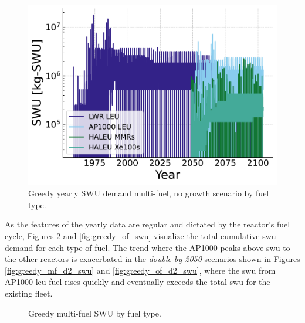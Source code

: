 \begin{figure}[H]
    \centering
    \includegraphics[scale=0.7]{images/results/swu/multi_dgng_swu_by_fuel.pdf}
    \caption{Greedy yearly SWU demand multi-fuel, no growth scenario by fuel type.}
    \label{fig:swu_yearly_greedy}
\end{figure}

As the features of the yearly data are regular and dictated by the reactor's fuel cycle, Figures \ref{fig:greedy_mf_swu} and \ref{fig:greedy_of_swu} visualize the total cumulative \gls{swu} demand for each type of fuel. The trend where the AP1000 peaks above \gls{swu} to the other reactors is exacerbated in the \textit{double by 2050} scenarios shown in Figures \ref{fig:greedy_mf_d2_swu} and \ref{fig:greedy_of_d2_swu}, where the \gls{swu} from AP1000 \gls{leu} fuel rises quickly and eventually exceeds the total \gls{swu} for the existing fleet.

\begin{figure}[H]
  \hfill
  \caption{Greedy multi-fuel SWU by fuel type.}
  \label{fig:greedy_mf_swu}
\end{figure}


